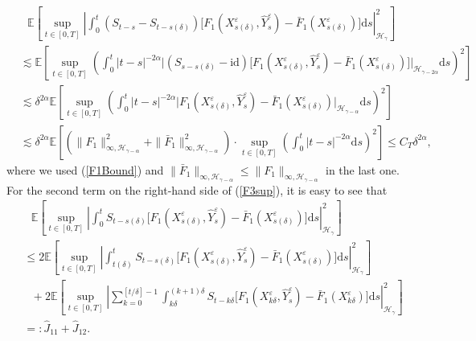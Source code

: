 \documentclass[10pt,a4paper]{article}
\numberwithin{equation}{section}
\begin{document}
\begin{align}\label{Fsup1}
&~~~\mathbb E \left[ \sup_{t \in [0,T]} \left| \int_0^t (S_{t-s}-S_{t-s(\delta)}) \big[ F_1(X_{s(\delta)}^\varepsilon,\hat{Y}_s^\varepsilon)-\bar{F}_1(X_{s(\delta)}^\varepsilon) \big] \mathrm{d} s \right|_{\mathcal H_\gamma }^2 \right]	 \nonumber\\
& \lesssim  \mathbb E \left[ \sup_{t \in [0,T]} \left( \int_0^t |t-s|^{-2\alpha}  \big| (S_{s-s(\delta)}-\mathrm{id}) \big[ F_1(X_{s(\delta)}^\varepsilon,\hat{Y}_s^\varepsilon)-\bar{F}_1(X_{s(\delta)}^\varepsilon) \big] \big|_{\mathcal H_{\gamma-2\alpha} } \mathrm{d} s \right)^2 \right]	 \nonumber\\	
& \lesssim \delta^{2\alpha} \mathbb E \left[ \sup_{t \in [0,T]} \left( \int_0^t |t-s|^{-2\alpha}  \big|  F_1(X_{s(\delta)}^\varepsilon,\hat{Y}_s^\varepsilon)-\bar{F}_1(X_{s(\delta)}^\varepsilon) \big|_{\mathcal H_{\gamma-\alpha} } \mathrm{d} s \right)^2 \right] \nonumber\\
& \lesssim \delta^{2\alpha} \mathbb E \left[\left( \|F_1\|_{\infty, \mathcal H_{\gamma-\alpha}}^2+ \|\bar{F}_1\|_{\infty, \mathcal H_{\gamma-\alpha}}^2   \right) \cdot \sup_{t \in [0,T]} \left( \int_0^t |t-s|^{-2\alpha} \mathrm{d} s \right)^2 \right]
\leq C_T \delta^{2\alpha},
\end{align}
where we used (\ref{F1Bound}) and $\|\bar{F}_1\|_{\infty,\mathcal H_{\gamma-\alpha}} \leq \|F_1\|_{\infty,\mathcal H_{\gamma-\alpha}}$ in the last one.
For the second term on the right-hand side of (\ref{F3sup}), it is easy to see that
\begin{align*}
&~~~\mathbb E \left[ \sup_{t \in [0,T]} \left| \int_0^t S_{t-s(\delta)} \big[ F_1(X_{s(\delta)}^\varepsilon,\hat{Y}_s^\varepsilon)-\bar{F}_1(X_{s(\delta)}^\varepsilon) \big]  \mathrm{d} s  \right|_{\mathcal H_\gamma }^2 \right] \nonumber\\
& \leq 2 \mathbb E \left[ \sup_{t \in [0,T]} \left| \int_{t(\delta)}^t S_{t-s(\delta)} \big[ F_1(X_{s(\delta)}^\varepsilon,\hat{Y}_s^\varepsilon)-\bar{F}_1(X_{s(\delta)}^\varepsilon) \big]  \mathrm{d} s  \right|_{\mathcal H_\gamma }^2 \right]	\nonumber\\
&~~~+2 \mathbb E \left[ \sup_{t \in [0,T]} \left| \sum_{k=0}^{[t/\delta]-1} \int_{k\delta}^{(k+1)\delta} S_{t-k\delta} \big[ F_1(X_{k\delta}^\varepsilon,\hat{Y}_s^\varepsilon)-\bar{F}_1(X_{k\delta}^\varepsilon) \big]  \mathrm{d} s  \right|_{\mathcal H_\gamma }^2 \right]  \nonumber\\
&=:\hat{J}_{11}+\hat{J}_{12}.
\end{align*}
\end{document}
